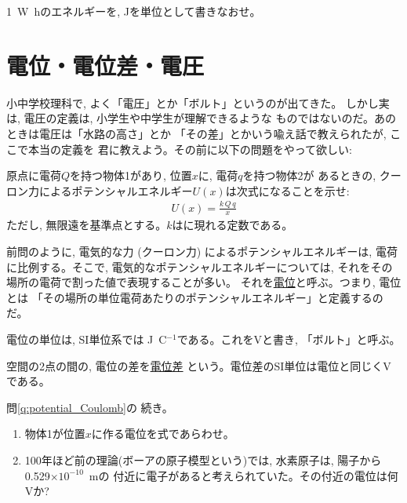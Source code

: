 \begin{q}\label{q:watt_hour}
1~W~hのエネルギーを, Jを単位として書きなおせ。
\end{q}
\hv



\section{電位・電位差・電圧}

小中学校理科で, よく「電圧」とか「ボルト」というのが出てきた。
しかし実は, 電圧の定義は, 小学生や中学生が理解できるような
ものではないのだ。あのときは電圧は「水路の高さ」とか
「その差」とかいう喩え話で教えられたが, ここで本当の定義を
君に教えよう。その前に以下の問題をやって欲しい:

\begin{q}\label{q:potential_Coulomb}
原点に電荷$Q$を持つ物体1があり, 位置$x$に, 電荷$q$を持つ物体2が
あるときの, クーロン力によるポテンシャルエネルギー$U(x)$は次式になることを示せ:
\begin{eqnarray}
U(x)=\frac{k\,Q\,q}{x}\label{eq:potential_Coulomb}
\end{eqnarray}
ただし, 無限遠を基準点とする。$k$はに現れる定数である。
\end{q}
\mv

前問のように, 電気的な力 (クーロン力) によるポテンシャルエネルギーは, 
電荷に比例する。そこで, 電気的なポテンシャルエネルギーについては, 
それをその場所の電荷で割った値で表現することが多い。
それを\underline{電位}と呼ぶ。つまり, 電位とは
「その場所の単位電荷あたりのポテンシャルエネルギー」と定義するのだ。

電位の単位は, SI単位系では J~C$^{-1}$である。これをVと書き, 「ボルト」と呼ぶ。

空間の2点の間の, 電位の差を\underline{電位差}
という。電位差のSI単位は電位と同じくVである。

\begin{q}\label{q:potential_Coulomb2} 問\ref{q:potential_Coulomb}の
続き。
\begin{enumerate}
\item 物体1が位置$x$に作る電位を式であらわせ。
\item 100年ほど前の理論(ボーアの原子模型という)では, 
水素原子は, 陽子から0.529$\times 10^{-10}$~mの
付近に電子があると考えられていた。その付近の電位は何Vか?
\end{enumerate}
\end{q}

